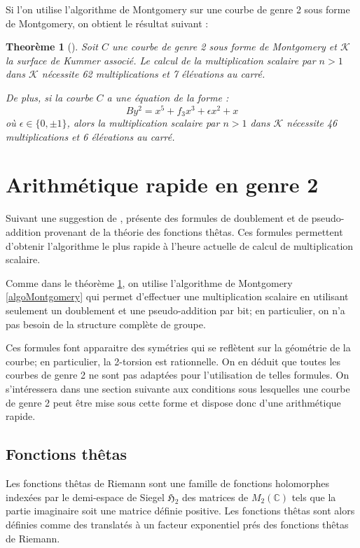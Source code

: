 \documentclass[a4paper]{article}
\newtheorem{theoreme}{Theorème}[section]
\theoremstyle{definition}
\theoremstyle{remark}
\numberwithin{equation}{section}
\begin{document}
Si l'on utilise l'algorithme de Montgomery sur une courbe de genre 2 sous forme de Montgomery, on obtient le résultat suivant :
\begin{theoreme}[\citet{duquesne}]
\label{thduquesne}
Soit $C$ une courbe de genre 2 sous forme de Montgomery et $\mathcal{K}$ la surface de Kummer associé. Le calcul de la multiplication scalaire par $n > 1$ dans $\mathcal{K}$ nécessite 62 multiplications et 7 élévations au carré.

De plus, si la courbe $C$ a une équation de la forme :
$$By^2 = x^5 + f_3 x^3 + \epsilon x^2 + x$$
où $\epsilon \in \{0,\pm 1\}$, alors la multiplication scalaire par $n > 1$ dans $\mathcal{K}$ nécessite 46 multiplications et 6 élévations au carré.
\end{theoreme}

\section{Arithmétique rapide en genre 2}

Suivant une suggestion de \cite{chudnovsky}, \citep{gaudry} présente des formules de doublement et de pseudo-addition provenant de la théorie des fonctions thêtas. Ces formules permettent d'obtenir l'algorithme le plus rapide à l'heure actuelle de calcul de multiplication scalaire.

Comme dans le théorème \ref{thduquesne}, on utilise l'algorithme de Montgomery \ref{algoMontgomery} qui permet d'effectuer une multiplication scalaire en utilisant seulement un doublement et une pseudo-addition par bit; en particulier, on n'a pas besoin de la structure complète de groupe.

Ces formules font apparaitre des symétries qui se reflètent sur la géométrie de la courbe; en particulier, la 2-torsion est rationnelle. On en déduit que toutes les courbes de genre 2 ne sont pas adaptées pour l'utilisation de telles formules. On s'intéressera dans une section suivante aux conditions sous lesquelles une courbe de genre 2 peut être mise sous cette forme et dispose donc d'une arithmétique rapide. 

\subsection{Fonctions thêtas}
Les fonctions thêtas de Riemann sont une famille de fonctions holomorphes indexées par le demi-espace de Siegel $\mathfrak{H}_2$ des matrices de $M_2(\mathbb{C})$ tels que la partie imaginaire soit une matrice définie positive. Les fonctions thêtas sont alors définies comme des translatés à un facteur exponentiel prés des fonctions thêtas de Riemann.
\end{document}
